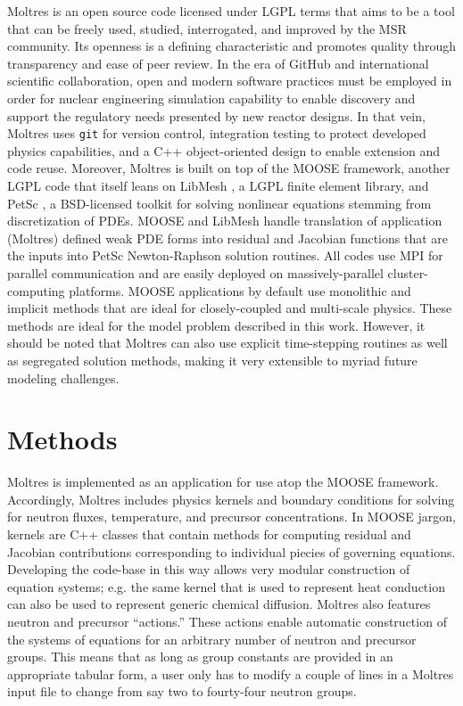 \documentclass{article}
\let\Oldsection\section
\renewcommand{\section}{\FloatBarrier\Oldsection}
\begin{document}
Moltres is an open source code licensed under \gls{LGPL} terms that aims to be a
tool that can be freely used, studied, interrogated, and improved by the
\gls{MSR} community.  Its openness is a defining characteristic and promotes
quality through transparency and ease of peer review. In the era of
GitHub\cite{noauthor_build_nodate} and international scientific collaboration,
open and modern software practices must be employed in order for nuclear
engineering simulation capability to enable discovery and support the regulatory
needs presented by new reactor designs. In that vein, Moltres uses
\texttt{git} for version control, integration testing to protect
developed physics capabilities, and a C++ object-oriented design to
enable extension and code reuse. Moreover, Moltres is built on
top of the \gls{MOOSE} framework, \cite{gaston_physics-based_2015} another
\gls{LGPL} code that itself leans on LibMesh \cite{kirk_libmesh:_2006}, a
\gls{LGPL} finite element library, and PetSc \cite{satish_balay_petsc_2015}, a
\gls{BSD}-licensed toolkit for solving nonlinear equations stemming from
discretization of PDEs. \gls{MOOSE} and LibMesh handle translation of
application (Moltres) defined weak PDE forms into residual and Jacobian
functions that are the inputs into PetSc Newton-Raphson solution routines. All
codes use MPI for parallel communication and are easily deployed on
massively-parallel cluster-computing platforms. \gls{MOOSE} applications by
default use monolithic and implicit methods that are ideal for closely-coupled
and multi-scale physics. These methods are ideal for the model problem described
in this work. However, it should be noted that Moltres can also use explicit
time-stepping routines as well as segregated solution methods, making it very
extensible to myriad future modeling challenges.

\section{Methods}

Moltres \cite{lindsay_arfc/moltres_nodate} is implemented as an application for
use atop the \gls{MOOSE} \cite{gaston_physics-based_2015} framework.
Accordingly, Moltres includes physics kernels and boundary conditions for
solving for neutron fluxes, temperature, and precursor concentrations. In \gls{MOOSE}
jargon, kernels are C++ classes that contain methods for computing residual and
Jacobian contributions corresponding to individual piecies of governing
equations. Developing the code-base in this way allows very modular construction
of equation systems; e.g. the same kernel that is used to represent heat
conduction can also be used to represent generic chemical diffusion. Moltres
also features neutron and precursor ``actions.'' These actions enable automatic
construction of the systems of equations for an arbitrary number of neutron and
precursor groups. This means that as long as group constants are provided in an appropriate
tabular form, a user only has to modify a couple of lines in a Moltres input
file to change from say two to fourty-four neutron groups.
\end{document}

